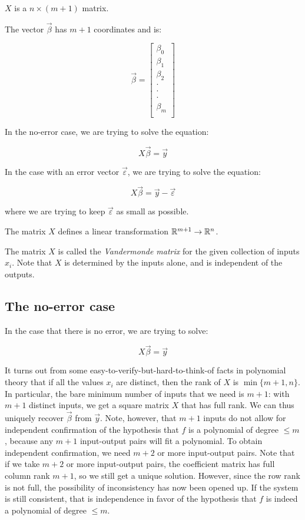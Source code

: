 \documentclass[10pt]{amsart}
\begin{document}
$X$ is a $n \times (m + 1)$ matrix.

The vector $\vec{\beta}$ has $m + 1$ coordinates and is:

$$\vec{\beta} = \left[ \begin{matrix} \beta_0 \\ \beta_1 \\ \beta_2 \\ \cdot \\ \cdot \\ \cdot \\ \beta_m \\\end{matrix}\right]$$

In the no-error case, we are trying to solve the equation:

$$X\vec{\beta} = \vec{y}$$

In the case with an error vector $\vec{\varepsilon}$, we are trying to solve
the equation:

$$X\vec{\beta} = \vec{y} - \vec{\varepsilon}$$

where we are trying to keep $\vec{\varepsilon}$ as small as possible.

The matrix $X$ defines a linear transformation $\mathbb{R}^{m+1} \to \mathbb{R}^n$.

The matrix $X$ is called the {\em Vandermonde matrix} for the given
collection of inputs $x_i$. Note that $X$ is determined by the inputs
alone, and is independent of the outputs.

\subsection{The no-error case}

In the case that there is no error, we are trying to solve:

$$X\vec{\beta} = \vec{y}$$

It turns out from some easy-to-verify-but-hard-to-think-of facts in
polynomial theory that if all the values $x_i$ are distinct, then the
rank of $X$ is $\min \{ m + 1,n \}$. In particular, the bare minimum
number of inputs that we need is $m + 1$: with $m + 1$ distinct
inputs, we get a square matrix $X$ that has full rank. We can thus
uniquely recover $\vec{\beta}$ from $\vec{y}$. Note, however, that $m
+ 1$ inputs do not allow for independent confirmation of the
hypothesis that $f$ is a polynomial of degree $\le m$, because any $m
+ 1$ input-output pairs will fit a polynomial. To obtain independent
confirmation, we need $m + 2$ or more input-output pairs. Note that if
we take $m + 2$ or more input-output pairs, the coefficient matrix has
full column rank $m + 1$, so we still get a unique solution. However,
since the row rank is not full, the possibility of inconsistency has
now been opened up. If the system is still consistent, that is
independence in favor of the hypothesis that $f$ is indeed a
polynomial of degree $\le m$.
\end{document}
